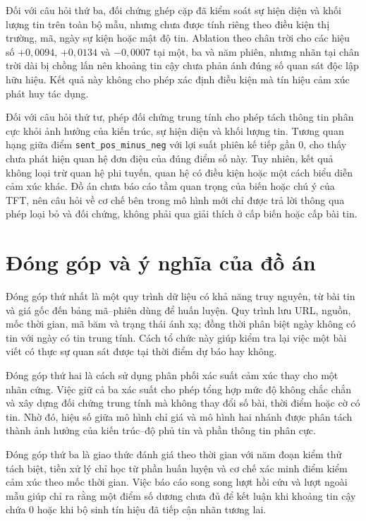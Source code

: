 \documentclass[12pt, a4paper, oneside]{report}
\begin{document}
Đối với câu hỏi thứ ba, đối chứng ghép cặp đã kiểm soát sự hiện diện và khối lượng tin
trên toàn bộ mẫu, nhưng chưa được tính riêng theo điều kiện thị trường, mã, ngày sự kiện
hoặc mật độ tin. Ablation theo chân trời cho các hiệu số $+0{,}0094$, $+0{,}0134$ và
$-0{,}0007$ tại một, ba và năm phiên, nhưng nhãn tại chân trời dài bị chồng lấn nên
khoảng tin cậy chưa phản ánh đúng số quan sát độc lập hữu hiệu. Kết quả này không cho
phép xác định điều kiện mà tín hiệu cảm xúc phát huy tác dụng.

Đối với câu hỏi thứ tư, phép đối chứng trung tính cho phép tách thông tin phân cực khỏi
ảnh hưởng của kiến trúc, sự hiện diện và khối lượng tin. Tương quan hạng giữa điểm
\texttt{sent\_pos\_minus\_neg} với lợi suất phiên kế tiếp gần 0, cho thấy chưa phát
hiện quan hệ đơn điệu của đúng điểm số này. Tuy nhiên, kết quả không loại trừ quan hệ
phi tuyến, quan hệ có điều kiện hoặc một cách biểu diễn cảm xúc khác. Đồ án chưa báo
cáo tầm quan trọng của biến hoặc chú ý của TFT, nên câu hỏi về cơ chế bên trong mô hình
mới chỉ được trả lời thông qua phép loại bỏ và đối chứng, không phải qua giải thích ở
cấp biến hoặc cấp bài tin.

\section{Đóng góp và ý nghĩa của đồ án}

Đóng góp thứ nhất là một quy trình dữ liệu có khả năng truy nguyên, từ bài tin và giá
gốc đến bảng mã--phiên dùng để huấn luyện. Quy trình lưu URL, nguồn, mốc thời gian, mã
băm và trạng thái ánh xạ; đồng thời phân biệt ngày không có tin với ngày có tin trung
tính. Cách tổ chức này giúp kiểm tra lại việc một bài viết có thực sự quan sát được tại
thời điểm dự báo hay không.

Đóng góp thứ hai là cách sử dụng phân phối xác suất cảm xúc thay cho một nhãn cứng.
Việc giữ cả ba xác suất cho phép tổng hợp mức độ không chắc chắn và xây dựng đối chứng
trung tính mà không thay đổi số bài, thời điểm hoặc cờ có tin. Nhờ đó, hiệu số giữa mô
hình chỉ giá và mô hình hai nhánh được phân tách thành ảnh hưởng của kiến trúc--độ phủ
tin và phần thông tin phân cực.

Đóng góp thứ ba là giao thức đánh giá theo thời gian với năm đoạn kiểm thử tách biệt,
tiền xử lý chỉ học từ phần huấn luyện và cơ chế xác minh điểm kiểm cảm xúc theo mốc thời
gian. Việc báo cáo song song lượt hồi cứu và lượt ngoài mẫu giúp chỉ ra rằng một điểm số
dương chưa đủ để kết luận khi khoảng tin cậy chứa 0 hoặc khi bộ sinh tín hiệu đã tiếp
cận nhãn tương lai.
\end{document}
